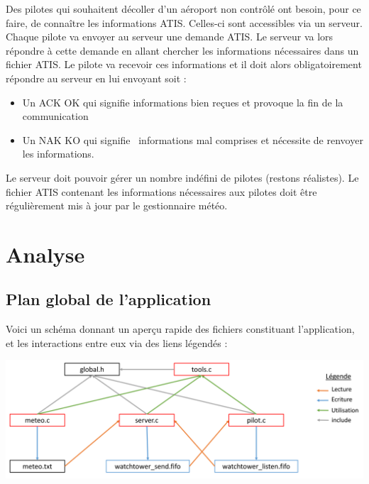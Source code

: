 \documentclass{report}
\begin{document}
		Des pilotes qui souhaitent décoller d’un aéroport non contrôlé ont besoin, pour ce faire, de connaître les informations ATIS. Celles-ci sont accessibles via un serveur.
		Chaque pilote va envoyer au serveur une demande ATIS. Le serveur va lors répondre à cette demande en allant chercher les informations nécessaires dans un fichier ATIS.
		Le pilote va recevoir ces informations et il doit alors obligatoirement répondre au serveur en lui envoyant soit :\newline
		\begin{itemize}
			\item Un ACK OK qui signifie \og informations bien reçues \fg et provoque la fin de la communication
			\item Un NAK KO qui signifie \og informations mal comprises \fg et nécessite de renvoyer les informations.
		\end{itemize}

		Le serveur doit pouvoir gérer un nombre indéfini de pilotes (restons réalistes).
		Le fichier ATIS contenant les informations nécessaires aux pilotes doit être régulièrement mis à jour par le gestionnaire météo.

\chapter{Analyse}
 \section{Plan global de l'application}
 	Voici un schéma donnant un aperçu rapide des fichiers constituant l'application, et les interactions entre eux via des liens légendés : \newline

	\includegraphics[width=\linewidth, frame]{schemasProjet.png} \newline
\end{document}
